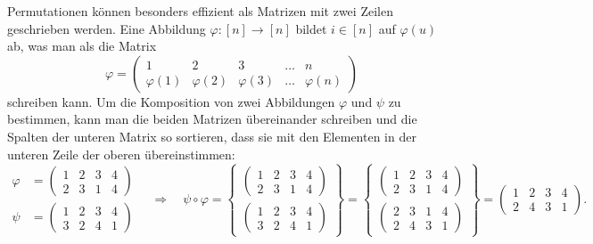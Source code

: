 Permutationen können besonders effizient als Matrizen mit zwei Zeilen
geschrieben werden.
Eine Abbildung $\varphi\colon [n]\to[n]$ bildet $i\in [n]$ auf $\varphi(u)$
ab, was man als die Matrix
\[
\varphi
=
\begin{pmatrix}
1&2&3&\dots&n\\
\varphi(1)&\varphi(2)&\varphi(3)&\dots&\varphi(n)
\end{pmatrix}
\]
schreiben kann.
Um die Komposition von zwei Abbildungen $\varphi$ und $\psi$ zu bestimmen,
kann man die beiden Matrizen übereinander schreiben und die Spalten der
unteren Matrix so sortieren, dass sie mit den Elementen in der unteren
Zeile der oberen übereinstimmen:
\[
\begin{aligned}
\varphi
&=
\begin{pmatrix}1&2&3&4\\2&3&1&4\end{pmatrix}
\\
\psi
&=
\begin{pmatrix}1&2&3&4\\3&2&4&1\end{pmatrix}
\end{aligned}
\quad\Rightarrow\quad
\psi\circ \varphi
=
\left\{
\begin{array}{c}
\displaystyle\begin{pmatrix}1&2&3&4\\2&3&1&4\end{pmatrix}\\
\displaystyle\begin{pmatrix}1&2&3&4\\3&2&4&1\end{pmatrix}
\end{array}
\right\}
=
\left\{
\begin{array}{c}
\displaystyle\begin{pmatrix}1&2&3&4\\2&3&1&4\end{pmatrix}\\
\displaystyle\begin{pmatrix}2&3&1&4\\2&4&3&1\end{pmatrix}
\end{array}
\right\}
=
\begin{pmatrix}
1&2&3&4\\
2&4&3&1
\end{pmatrix}.
\]

